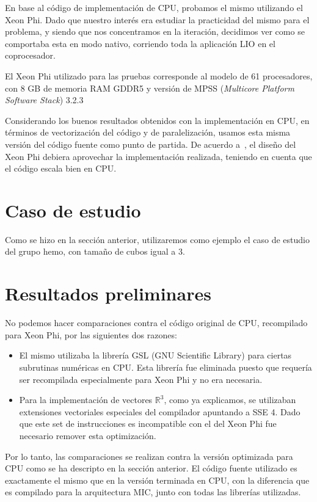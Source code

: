 En base al c\'odigo de implementaci\'on de CPU, probamos el mismo
utilizando el Xeon Phi. Dado que nuestro inter\'es era estudiar la
practicidad del mismo para el problema, y siendo que nos concentramos
en la iteraci\'on, decidimos ver como se comportaba esta en modo
nativo, corriendo toda la aplicaci\'on LIO en el coprocesador.

El Xeon Phi utilizado para las pruebas corresponde al modelo de
61 procesadores, con 8 GB de memoria RAM GDDR5 y versi\'on de MPSS
(\textit{Multicore Platform Software Stack}) 3.2.3

Considerando los buenos resultados obtenidos con la implementaci\'on
en CPU, en t\'erminos de vectorizaci\'on del c\'odigo y de paralelizaci\'on,
usamos esta misma versi\'on del c\'odigo fuente como punto de partida. De
acuerdo a~\cite{Jeffers}, el dise\~no del Xeon Phi debiera aprovechar la
implementaci\'on realizada, teniendo en cuenta que el c\'odigo escala bien
en CPU.

\section{Caso de estudio}

Como se hizo en la secci\'on anterior, utilizaremos como ejemplo el caso de
estudio del grupo hemo, con tama\~no de cubos igual a 3.

\section{Resultados preliminares}

No podemos hacer comparaciones contra el c\'odigo original de CPU, recompilado
para Xeon Phi, por las siguientes dos razones:

\begin{itemize}
    \item El mismo utilizaba la librer\'ia GSL (GNU Scientific Library) para
    ciertas subrutinas num\'ericas en CPU. Esta librer\'ia fue eliminada puesto
    que requer\'ia ser recompilada especialmente para Xeon Phi y no era necesaria.
    \item Para la implementaci\'on de vectores $\mathbb{R}^3$, como ya explicamos,
    se utilizaban extensiones vectoriales especiales del compilador apuntando a
    SSE 4. Dado que este set de instrucciones es incompatible con el del Xeon Phi
    fue necesario remover esta optimizaci\'on.
\end{itemize}

Por lo tanto, las comparaciones se realizan contra la versi\'on optimizada para
CPU como se ha descripto en la secci\'on anterior. El c\'odigo fuente utilizado
es exactamente el mismo que en la versi\'on terminada en CPU, con la diferencia
que es compilado para la arquitectura MIC, junto con todas las librer\'ias
utilizadas.

